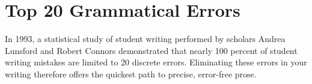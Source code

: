 
 
 
\chapter{Top 20 Grammatical Errors}

In 1993, a statistical study of student writing performed by scholars Andrea Lunsford and Robert Connors demonstrated that nearly 100 percent of student writing mistakes are limited to 20 discrete errors. Eliminating these errors in your writing therefore offers the quickest path to precise, error-free prose.

